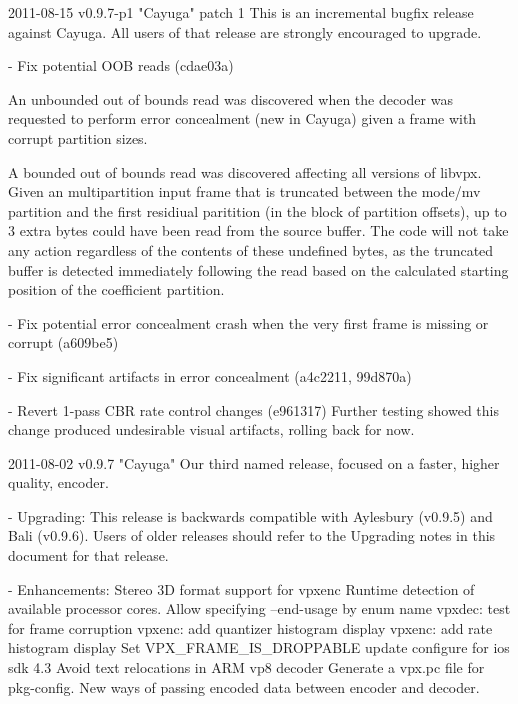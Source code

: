 
\begin{DoxyVerbInclude}
2011-08-15 v0.9.7-p1 "Cayuga" patch 1
  This is an incremental bugfix release against Cayuga. All users of that
  release are strongly encouraged to upgrade.

    - Fix potential OOB reads (cdae03a)

          An unbounded out of bounds read was discovered when the
          decoder was requested to perform error concealment (new in
          Cayuga) given a frame with corrupt partition sizes.

          A bounded out of bounds read was discovered affecting all
          versions of libvpx. Given an multipartition input frame that
          is truncated between the mode/mv partition and the first
          residiual paritition (in the block of partition offsets), up
          to 3 extra bytes could have been read from the source buffer.
          The code will not take any action regardless of the contents
          of these undefined bytes, as the truncated buffer is detected
          immediately following the read based on the calculated
          starting position of the coefficient partition.

    - Fix potential error concealment crash when the very first frame
      is missing or corrupt (a609be5)

    - Fix significant artifacts in error concealment (a4c2211, 99d870a)

    - Revert 1-pass CBR rate control changes (e961317)
      Further testing showed this change produced undesirable visual
      artifacts, rolling back for now.


2011-08-02 v0.9.7 "Cayuga"
  Our third named release, focused on a faster, higher quality, encoder.

  - Upgrading:
    This release is backwards compatible with Aylesbury (v0.9.5) and
    Bali (v0.9.6). Users of older releases should refer to the Upgrading
    notes in this document for that release.

  - Enhancements:
          Stereo 3D format support for vpxenc
          Runtime detection of available processor cores.
          Allow specifying --end-usage by enum name
          vpxdec: test for frame corruption
          vpxenc: add quantizer histogram display
          vpxenc: add rate histogram display
          Set VPX_FRAME_IS_DROPPABLE
          update configure for ios sdk 4.3
          Avoid text relocations in ARM vp8 decoder
          Generate a vpx.pc file for pkg-config.
          New ways of passing encoded data between encoder and decoder.


\end{DoxyVerbInclude}
